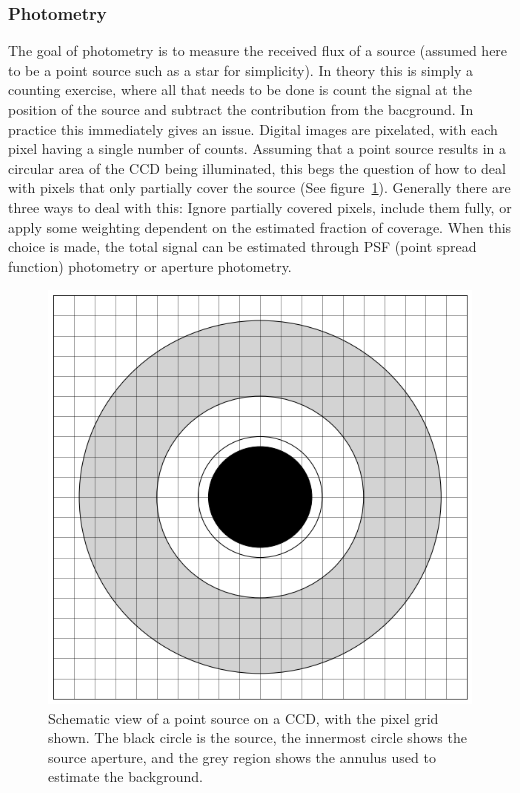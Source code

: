 \documentclass[a4paper,oneside,12pt, class=Latex/Classes/PhDthesisPSnPDF, crop=false]{standalone}
\begin{document}
\subsubsection{Photometry}
The goal of photometry is to measure the received flux of a source (assumed here to be a point source such as a star for simplicity). In theory this is simply a counting exercise, where all that needs to be done is count the signal at the position of the source and subtract the contribution from the bacground. In practice this immediately gives an issue. Digital images are pixelated, with each pixel having a single number of counts. Assuming that a point source results in a circular area of the CCD being illuminated, this begs the question of how to deal with pixels that only partially cover the source (See figure~\ref{aperture}). Generally there are three ways to deal with this: Ignore partially covered pixels, include them fully, or apply some weighting dependent on the estimated fraction of coverage. When this choice is made, the total signal can be estimated through PSF (point spread function) photometry or aperture photometry.

\begin{figure}
    \centering
    \includegraphics[width=\textwidth]{../Images/chapter_2/aperture.png}
    \caption[Schematic view of a point source on a CCD]{Schematic view of a point source on a CCD, with the pixel grid shown. The black circle is the source, the innermost circle shows the source aperture, and the grey region shows the annulus used to estimate the background.}
    \label{aperture}
\end{figure}
\end{document}
